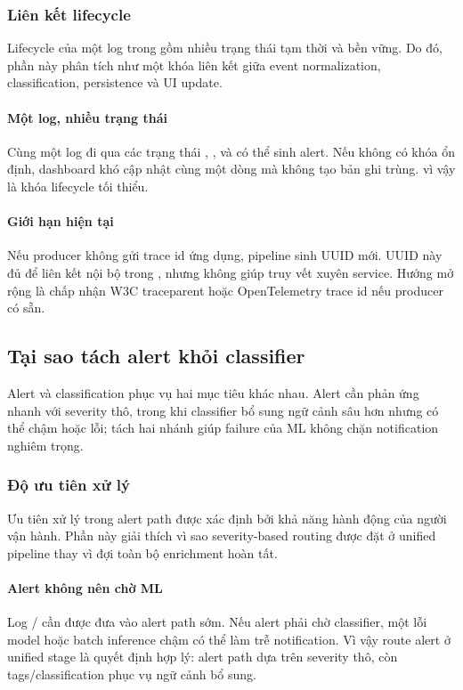 \subsubsection{Liên kết lifecycle}

Lifecycle của một log trong \LogRider{} gồm nhiều trạng thái tạm thời và bền vững. Do đó, phần này phân tích  như một khóa liên kết giữa event normalization, classification, persistence và UI update.
\paragraph{Một log, nhiều trạng thái}
Cùng một log đi qua các trạng thái , ,  và có thể sinh alert. Nếu không có khóa ổn định, dashboard khó cập nhật cùng một dòng mà không tạo bản ghi trùng.  vì vậy là khóa lifecycle tối thiểu.
\paragraph{Giới hạn hiện tại}
Nếu producer không gửi trace id ứng dụng, pipeline sinh UUID mới. UUID này đủ để liên kết nội bộ trong \LogRider{}, nhưng không giúp truy vết xuyên service. Hướng mở rộng là chấp nhận W3C traceparent hoặc OpenTelemetry trace id nếu producer có sẵn.

\subsection{Tại sao tách alert khỏi classifier}

Alert và classification phục vụ hai mục tiêu khác nhau. Alert cần phản ứng nhanh với severity thô, trong khi classifier bổ sung ngữ cảnh sâu hơn nhưng có thể chậm hoặc lỗi; tách hai nhánh giúp failure của ML không chặn notification nghiêm trọng.
\subsubsection{Độ ưu tiên xử lý}

Ưu tiên xử lý trong alert path được xác định bởi khả năng hành động của người vận hành. Phần này giải thích vì sao severity-based routing được đặt ở unified pipeline thay vì đợi toàn bộ enrichment hoàn tất.
\paragraph{Alert không nên chờ ML}
Log / cần được đưa vào alert path sớm. Nếu alert phải chờ classifier, một lỗi model hoặc batch inference chậm có thể làm trễ notification. Vì vậy route alert ở unified stage là quyết định hợp lý: alert path dựa trên severity thô, còn tags/classification phục vụ ngữ cảnh bổ sung.
